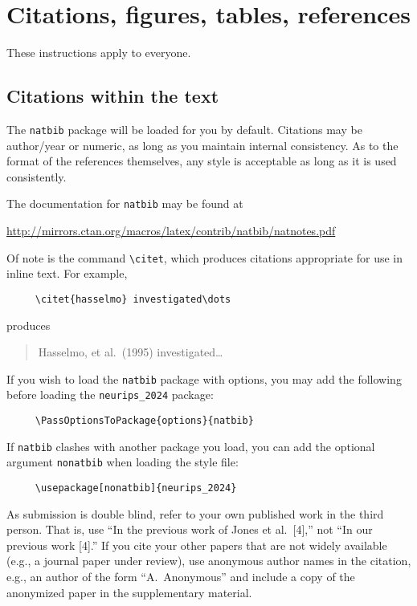   
  \section{Citations, figures, tables, references}
  \label{others}
  
  
  These instructions apply to everyone.
  
  
  \subsection{Citations within the text}
  
  
  The \verb+natbib+ package will be loaded for you by default.  Citations may be
  author/year or numeric, as long as you maintain internal consistency.  As to the
  format of the references themselves, any style is acceptable as long as it is
  used consistently.
  
  
  The documentation for \verb+natbib+ may be found at
  \begin{center}
    \url{http://mirrors.ctan.org/macros/latex/contrib/natbib/natnotes.pdf}
  \end{center}
  Of note is the command \verb+\citet+, which produces citations appropriate for
  use in inline text.  For example,
  \begin{verbatim}
     \citet{hasselmo} investigated\dots
  \end{verbatim}
  produces
  \begin{quote}
    Hasselmo, et al.\ (1995) investigated\dots
  \end{quote}
  
  
  If you wish to load the \verb+natbib+ package with options, you may add the
  following before loading the \verb+neurips_2024+ package:
  \begin{verbatim}
     \PassOptionsToPackage{options}{natbib}
  \end{verbatim}
  
  
  If \verb+natbib+ clashes with another package you load, you can add the optional
  argument \verb+nonatbib+ when loading the style file:
  \begin{verbatim}
     \usepackage[nonatbib]{neurips_2024}
  \end{verbatim}
  
  
  As submission is double blind, refer to your own published work in the third
  person. That is, use ``In the previous work of Jones et al.\ [4],'' not ``In our
  previous work [4].'' If you cite your other papers that are not widely available
  (e.g., a journal paper under review), use anonymous author names in the
  citation, e.g., an author of the form ``A.\ Anonymous'' and include a copy of the anonymized paper in the supplementary material.
  
